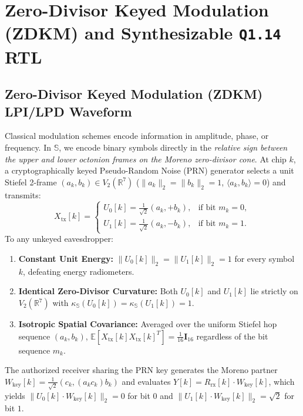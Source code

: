 \documentclass[journal,twoside]{IEEEtran}
\theoremstyle{definition}
\theoremstyle{remark}
\newcommand{\R}{\mathbb{R}}
\newcommand{\Se}{\mathbb{S}}
\newcommand{\kappas}{\kappa_{\Se}}
\begin{document}
\section{Zero-Divisor Keyed Modulation (ZDKM) and Synthesizable \texttt{Q1.14} RTL}
\label{sec:zdkm}
\subsection{Zero-Divisor Keyed Modulation (ZDKM) LPI/LPD Waveform}
Classical modulation schemes encode information in amplitude, phase, or frequency. In $\Se$, we encode binary symbols directly in the \emph{relative sign between the upper and lower octonion frames on the Moreno zero-divisor cone}. At chip $k$, a cryptographically keyed Pseudo-Random Noise (PRN) generator selects a unit Stiefel 2-frame $(a_k, b_k) \in V_2(\R^7)$ ($\|a_k\|_2 = \|b_k\|_2 = 1$, $\langle a_k, b_k\rangle = 0$) and transmits:
\begin{equation}
    X_{\mathrm{tx}}[k] = \begin{cases}
        U_0[k] = \frac{1}{\sqrt{2}}(a_k, +b_k), & \text{if bit } m_k = 0,\\[4pt]
        U_1[k] = \frac{1}{\sqrt{2}}(a_k, -b_k), & \text{if bit } m_k = 1.
    \end{cases}
    \label{eq:zdkm_tx}
\end{equation}
To any unkeyed eavesdropper:
\begin{enumerate}
    \item \textbf{Constant Unit Energy:} $\|U_0[k]\|_2 = \|U_1[k]\|_2 = 1$ for every symbol $k$, defeating energy radiometers.
    \item \textbf{Identical Zero-Divisor Curvature:} Both $U_0[k]$ and $U_1[k]$ lie strictly on $V_2(\R^7)$ with $\kappas(U_0[k]) = \kappas(U_1[k]) = 1$.
    \item \textbf{Isotropic Spatial Covariance:} Averaged over the uniform Stiefel hop sequence $(a_k, b_k)$, $\mathbb{E}[X_{\mathrm{tx}}[k]X_{\mathrm{tx}}[k]^T] = \frac{1}{16}\bm{I}_{16}$ regardless of the bit sequence $m_k$.
\end{enumerate}
The authorized receiver sharing the PRN key generates the Moreno partner $W_{\mathrm{key}}[k] = \frac{1}{\sqrt{2}}(c_k, (a_k c_k)b_k)$ and evaluates $Y[k] = R_{\mathrm{rx}}[k] \cdot W_{\mathrm{key}}[k]$, which yields $\|U_0[k]\cdot W_{\mathrm{key}}[k]\|_2 = 0$ for bit $0$ and $\|U_1[k]\cdot W_{\mathrm{key}}[k]\|_2 = \sqrt{2}$ for bit $1$.
\end{document}
